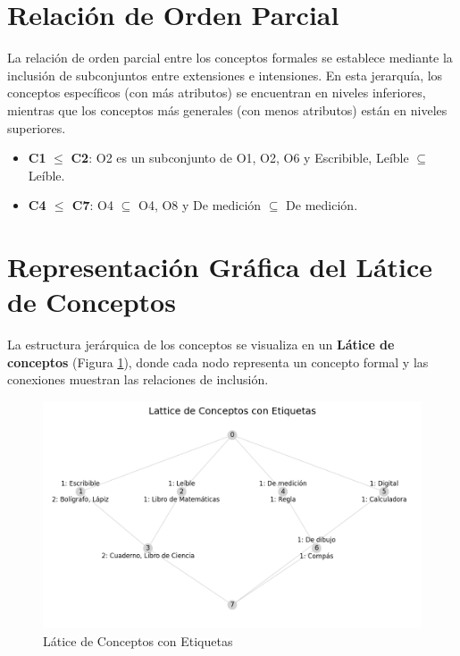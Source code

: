 \section{Relación de Orden Parcial}

La relación de orden parcial entre los conceptos formales se establece mediante la inclusión de subconjuntos entre extensiones e intensiones. En esta jerarquía, los conceptos específicos (con más atributos) se encuentran en niveles inferiores, mientras que los conceptos más generales (con menos atributos) están en niveles superiores.

\begin{itemize}
    \item \textbf{C1} $\leq$ \textbf{C2}: {O2} es un subconjunto de {O1, O2, O6} y {Escribible, Leíble} $\subseteq$ {Leíble}.
    \item \textbf{C4 $\leq$ C7}: {O4} $\subseteq$ {O4, O8} y {De medición} $\subseteq$ {De medición}.
  \end{itemize}
  
\section{Representación Gráfica del Látice de Conceptos}

La estructura jerárquica de los conceptos se visualiza en un \textbf{Látice de conceptos} (Figura \ref{fig:lattice_view}), donde cada nodo representa un concepto formal y las conexiones muestran las relaciones de inclusión.

\begin{figure}[H]
  \centering
  \includegraphics[width=\textwidth]{Figures/1. Content/lattice_view.png}
  \caption{Látice de Conceptos con Etiquetas}
  \label{fig:lattice_view}
\end{figure}

